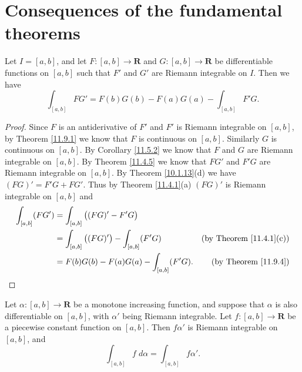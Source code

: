 \section{Consequences of the fundamental theorems}\label{sec 11.10}

\begin{proposition}\label{11.10.1}
    Let \(I = [a, b]\), and let \(F : [a, b] \to \mathbf{R}\) and \(G : [a, b] \to \mathbf{R}\) be differentiable functions on \([a, b]\) such that \(F'\) and \(G'\) are Riemann integrable on \(I\).
    Then we have
    \[
        \int_{[a, b]} F G' = F(b) G(b) - F(a) G(a) - \int_{[a, b]} F' G.
    \]
\end{proposition}

\begin{proof}
    Since \(F\) is an antiderivative of \(F'\) and \(F'\) is Riemann integrable on \([a, b]\), by Theorem \ref{11.9.1} we know that \(F\) is continuous on \([a, b]\).
    Similarly \(G\) is continuous on \([a, b]\).
    By Corollary \ref{11.5.2} we know that \(F\) and \(G\) are Riemann integrable on \([a, b]\).
    By Theorem \ref{11.4.5} we know that \(F G'\) and \(F' G\) are Riemann integrable on \([a, b]\).
    By Theorem \ref{10.1.13}(d) we have \((FG)' = F' G + F G'\).
    Thus by Theorem \ref{11.4.1}(a) \((FG)'\) is Riemann integrable on \([a, b]\) and
    \begin{align*}
        \int_{[a, b]} (F G') & = \int_{[a, b]} \big((FG)' - F' G\big)                                                       \\
                             & = \int_{[a, b]} \big((FG)'\big) - \int_{[a, b]} (F' G) & \text{(by Theorem \ref{11.4.1}(c))} \\
                             & = F(b) G(b) - F(a) G(a) - \int_{[a, b]} (F' G).        & \text{(by Theorem \ref{11.9.4})}
    \end{align*}
\end{proof}

\begin{theorem}\label{11.10.2}
    Let \(\alpha : [a, b] \to \mathbf{R}\) be a monotone increasing function, and suppose that \(\alpha\) is also differentiable on \([a, b]\), with \(\alpha'\) being Riemann integrable.
    Let \(f : [a, b] \to \mathbf{R}\) be a piecewise constant function on \([a, b]\).
    Then \(f \alpha'\) is Riemann integrable on \([a, b]\), and
    \[
        \int_{[a, b]} f \; d \alpha = \int_{[a, b]} f \alpha'.
    \]
\end{theorem}

